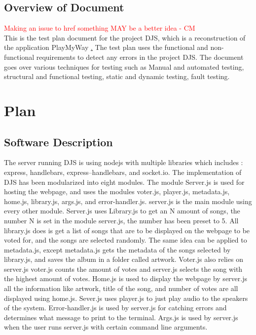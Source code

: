 \documentclass[12pt, titlepage]{article}
\begin{document}
\subsection{Overview of Document}
\textcolor{red}{Making an issue to href something MAY be a better idea - CM} \\
This is the test plan document for the project DJS, which is a reconstruction of the application PlayMyWay \href{https://github.com/malithsen/playmyway}.
The test plan uses the functional and non-functional requirements to detect any errors in the project DJS.
The document goes over various techniques for testing such as Manual and automated testing, structural and
functional testing, static and dynamic testing, fault testing.

\section{Plan}
	
\subsection{Software Description}
The server running DJS is using nodejs with multiple libraries which includes : express, handlebars, express--handlebars, and socket.io. The implementation of DJS has been modularized into eight modules. The module Server.js is used for hosting the webpage, and uses the modules voter.js, player.js, metadata.js, home.js, library.js, args.js, and error-handler.js. server.js is the main module using every other module. Server.js uses Library.js to get an N amount of songs, the number N is set in the module server.js, the number has been preset to 5. All library.js does is get a list of songs that are to be displayed on the webpage to be voted for, and the songs are selected randomly. The same idea can be applied to metadata.js, except metadata.js gets the metadata of the songs selected by library.js, and saves the album in a folder called artwork. Voter.js also relies on server.js voter.js counts the amount of votes and server.js selects the song with the highest amount of votes. Home.js is used to display the webpage by server.js all the information like artwork, title of the song, and number of votes are all displayed using home.js. Sever.js uses player.js to just play audio to the speakers of the system. Error-handler.js is used by server.js for catching errors and determines what message to print to the terminal. Args.js is used by server.js when the user runs server.js with certain command line arguments.
\end{document}

